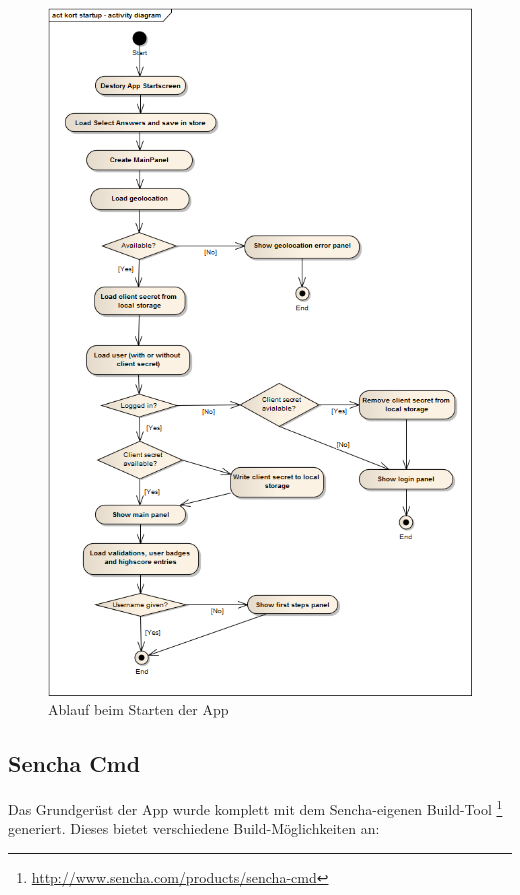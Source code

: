 \begin{figure}[H]
	\centering
	\includegraphics[scale=0.63]{images/uml/kort-startup-activitydiagram}
	\caption{Ablauf beim Starten der App}
	\label{image-kort-startup-activitydiagram}
\end{figure}

\subsection{Sencha Cmd}
\label{sencha-cmd}
Das Grundgerüst der App wurde komplett mit dem Sencha-eigenen Build-Tool \footnote{\url{http://www.sencha.com/products/sencha-cmd}} generiert.
Dieses bietet verschiedene Build-Möglichkeiten an:

